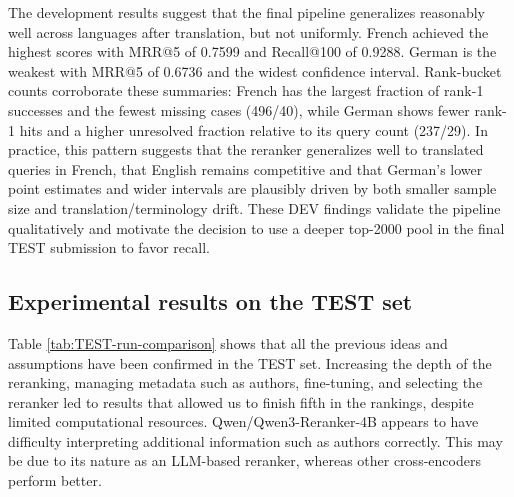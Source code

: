 The development results suggest that the final pipeline generalizes reasonably well across languages after translation, but not uniformly. French achieved the highest scores with MRR@5 of 0.7599 and Recall@100 of 0.9288. German is the weakest with MRR@5 of 0.6736 and the widest confidence interval.
Rank-bucket counts corroborate these summaries: French has the largest fraction of rank-1 successes and the fewest missing cases (496/40), while German shows fewer rank-1 hits and a higher unresolved fraction relative to its query count (237/29).
In practice, this pattern suggests that the reranker generalizes well to translated queries in French, that English remains competitive and that German's lower point estimates and wider intervals are plausibly driven by both smaller sample size and translation/terminology drift. These DEV findings validate the pipeline qualitatively and motivate the decision to use a deeper top-2000 pool in the final TEST submission to favor recall.

\begin{table}[htbp]
    \centering
    \footnotesize
    \caption{Fine-tuned Nemotron LoRA validation on labeled development data. The final column reports rank-bucket counts for strong successes and unresolved failures.}\label{tab:multilingual-dev}
\end{table}


\subsection{Experimental results on the TEST set}
Table \ref{tab:TEST-run-comparison} shows that all the previous ideas and assumptions have been confirmed in the TEST set. Increasing the depth of the reranking, managing metadata such as authors, fine-tuning, and selecting the reranker led to results that allowed us to finish fifth in the rankings, despite limited computational resources. 
Qwen/Qwen3-Reranker-4B appears to have difficulty interpreting additional information such as authors correctly. This may be due to its nature as an LLM-based reranker, whereas other cross-encoders perform better.

